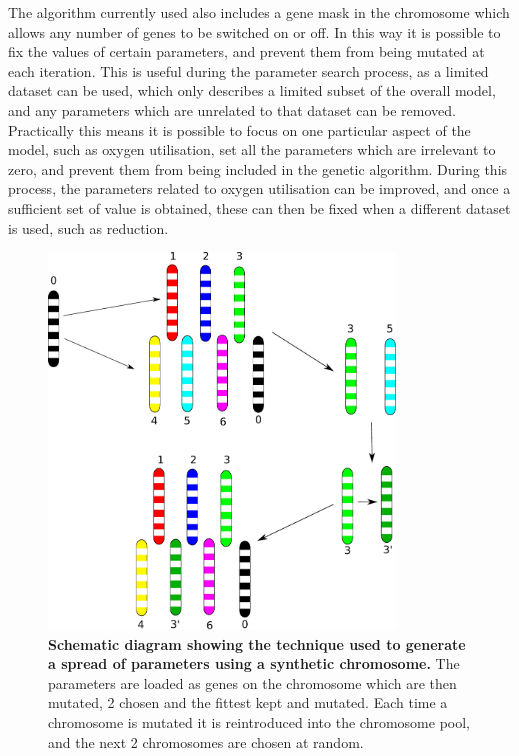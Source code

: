 The algorithm currently used also includes a gene mask in the chromosome which allows any number of genes to be switched on or off. In this way it is possible to fix the values of certain parameters, and prevent them from being mutated at each iteration. This is useful during the parameter search process, as a limited dataset can be used, which only describes a limited subset of the overall model, and any parameters which are unrelated to that dataset can be removed. Practically this means it is possible to focus on one particular aspect of the model, such as oxygen utilisation, set all the parameters which are irrelevant to zero, and prevent them from being included in the genetic algorithm. During this process, the parameters related to oxygen utilisation can be improved, and once a sufficient set of value is obtained, these can then be fixed when a different dataset is used, such as \cNO \space reduction.

\begin{figure}
\begin{center}
\includegraphics[height=10cm]{./03-parameterestimationmethodologies/data/sa_spread.pdf}
\end{center}
\caption[{Schematic diagram showing the technique used to generate a spread of parameters using a synthetic chromosome.}]{{\bf Schematic diagram showing the technique used to generate a spread of parameters using a synthetic chromosome.} The parameters are loaded as genes on the chromosome which are then mutated, 2 chosen and the fittest kept and mutated. Each time a chromosome is mutated it is reintroduced into the chromosome pool, and the next 2 chromosomes are chosen at random.
\label{fig:sa_spread}}
\end{figure} 





